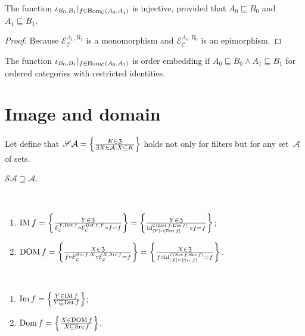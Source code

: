 \begin{prop}
  The function $\iota_{B_0, B_1} |_{f \in \operatorname{Hom}_{\mathcal{C}} (A_0 ,
  A_1)}$ is injective, provided that
  $A_0\sqsubseteq B_0$ and $A_1\sqsubseteq B_1$.
\end{prop}

\begin{proof}
  Because $\mathcal{E}_{\mathcal{C}}^{A_1,B_1}$ is a monomorphism and $\mathcal{E}_{\mathcal{C}}^{A_0,B_0}$ is an epimorphism.
\end{proof}

\begin{cor}\label{iota-emb}
  The function $\iota_{B_0, B_1} |_{f \in \operatorname{Hom}_{\mathcal{C}} (A_0 ,
  A_1)}$ is order embedding if $A_0 \sqsubseteq B_0 \wedge A_1 \sqsubseteq B_1$ for ordered categories
  with restricted identities.
\end{cor}

\section{Image and domain}

Let define that
$\mathscr{S}\mathcal{A}=\left\{ \frac{K\in\mathfrak{Z}}{
\exists X\in\mathcal{A}:X\subseteq K}\right\}$
holds not only for filters but for any set~$\mathcal{A}$ of
sets.

\begin{obvious}
$\mathscr{S}\mathcal{A}\supseteq\mathcal{A}$.
\end{obvious}

\begin{defn}
~
\begin{enumerate}
\item $\operatorname{IM} f = \left\{ \frac{Y \in \mathfrak{Z}}{\mathcal{E}_{\mathcal{C}}^{Y, \operatorname{Dst} f} \circ \mathcal{E}_{\mathcal{C}}^{\operatorname{Dst} f,
Y} \circ f = f}\right\} = \left\{ \frac{Y \in \mathfrak{Z}}{\operatorname{id}^{\mathcal{C}(\operatorname{Dst} f,\operatorname{Dst} f)}_{[Y]\sqcap[\operatorname{Dst} f]} \circ f = f}\right\}$;
\item $\operatorname{DOM} f = \left\{ \frac{X \in \mathfrak{Z}}{f\circ\mathcal{E}_{\mathcal{C}}^{\operatorname{Src} f, X} \circ \mathcal{E}_{\mathcal{C}}^{X, \operatorname{Src} f} = f}\right\} = \left\{ \frac{X \in \mathfrak{Z}}{f \circ \operatorname{id}^{\mathcal{C}(\operatorname{Src} f,\operatorname{Src} f)}_{[X]\sqcap[\operatorname{Src} f]} = f}\right\}$.
\end{enumerate}
\end{defn}

\begin{defn}
~
\begin{enumerate}
\item $\operatorname{Im} f = \left\{ \frac{Y\in\operatorname{IM} f}{Y\sqsubseteq\operatorname{Dst} f}\right\}$;
\item $\operatorname{Dom} f = \left\{ \frac{X\in\operatorname{DOM} f}{X\sqsubseteq\operatorname{Src} f}\right\}$.
\end{enumerate}
\end{defn}

